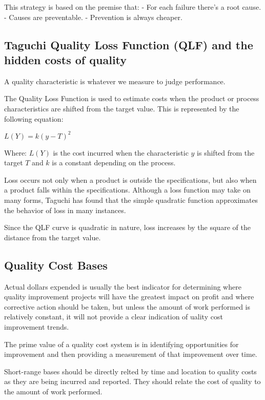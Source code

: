 \documentclass[11pt]{article}
\begin{document}
This strategy is based on the premise that: - For each failure there's a
root cause. - Causes are preventable. - Prevention is always cheaper.

\hypertarget{taguchi-quality-loss-function-qlf-and-the-hidden-costs-of-quality}{%
\subsection{Taguchi Quality Loss Function (QLF) and the hidden costs of
quality}\label{taguchi-quality-loss-function-qlf-and-the-hidden-costs-of-quality}}

A quality characteristic is whatever we measure to judge performance.

The Quality Loss Function is used to estimate costs when the product or
process characteristics are shifted from the target value. This is
represented by the following equation:

\(L(Y) = k(y-T)^2\)

Where: \(L(Y)\) is the cost incurred when the characteristic \(y\) is
shifted from the target \(T\) and \(k\) is a constant depending on the
process.

Loss occurs not only when a product is outside the specifications, but
also when a product falls within the specifications. Although a loss
function may take on many forms, Taguchi has found that the simple
quadratic function approximates the behavior of loss in many instances.

Since the QLF curve is quadratic in nature, loss increases by the square
of the distance from the target value.

\hypertarget{quality-cost-bases}{%
\subsection{Quality Cost Bases}\label{quality-cost-bases}}

Actual dollars expended is usually the best indicator for determining
where quality improvement projects will have the greatest impact on
profit and where corrective action should be taken, but unless the
amount of work performed is relatively constant, it will not provide a
clear indication of uality cost improvement trends.

The prime value of a quality cost system is in identifying opportunities
for improvement and then providing a measurement of that improvement
over time.

Short-range bases should be directly relted by time and location to
quality costs as they are being incurred and reported. They should
relate the cost of quality to the amount of work performed.
\end{document}

